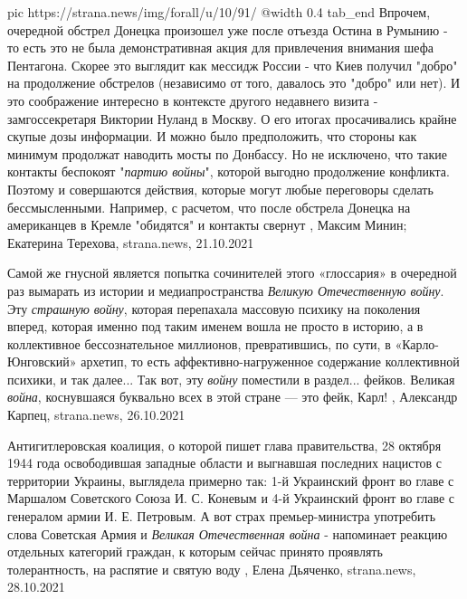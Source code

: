 	pic https://strana.news/img/forall/u/10/91/%
  @width 0.4
tab_end
\fi
Впрочем, очередной обстрел Донецка произошел уже после отъезда Остина в Румынию
- то есть это не была демонстративная акция для привлечения внимания шефа
Пентагона. Скорее это выглядит как мессидж России - что Киев получил "добро" на
продолжение обстрелов (независимо от того, давалось это "добро" или нет). 
И это соображение интересно в контексте другого недавнего визита -
замгоссекретаря Виктории Нуланд в Москву. О его итогах просачивались крайне
скупые дозы информации. И можно было предположить, что стороны как минимум
продолжат наводить мосты по Донбассу.  
Но не исключено, что такие контакты беспокоят "\emph{партию войны}", которой выгодно
продолжение конфликта. Поэтому и совершаются действия, которые могут любые
переговоры сделать бессмысленными. Например, с расчетом, что после обстрела
Донецка на американцев в Кремле "обидятся" и контакты свернут
, 
Максим Минин; Екатерина Терехова, strana.news, 21.10.2021

Самой же гнусной является попытка сочинителей этого «глоссария» в очередной раз
вымарать из истории и медиапространства \emph{Великую Отечественную войну}. Эту
\emph{страшную войну}, которая перепахала массовую психику на поколения вперед,
которая именно под таким именем вошла не просто в историю, а в коллективное
бессознательное миллионов, превратившись, по сути, в «Карло-Юнговский» архетип,
то есть аффективно-нагруженное содержание коллективной психики, и так далее...
Так вот, эту \emph{войну} поместили в раздел... фейков. Великая \emph{война}, коснувшаяся
буквально всех в этой стране — это фейк, Карл!
, 
Александр Карпец, strana.news, 26.10.2021

Антигитлеровская коалиция, о которой пишет глава правительства, 28 октября 1944
года освободившая западные области и выгнавшая последних нацистов с территории
Украины, выглядела примерно так: 1-й Украинский фронт во главе с Маршалом
Советского Союза И. С. Коневым и 4-й Украинский фронт во главе с генералом
армии И. Е. Петровым.  А вот страх премьер-министра употребить слова Советская
Армия и \emph{Великая Отечественная война} - напоминает реакцию отдельных категорий
граждан, к которым сейчас принято проявлять толерантность, на распятие и святую
воду
, 
Елена Дьяченко, strana.news, 28.10.2021

